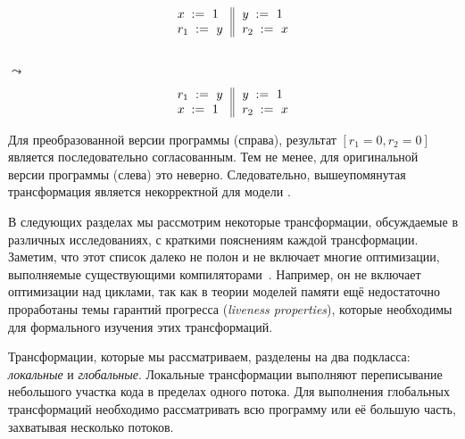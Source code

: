 \begin{minipage}{0.45\linewidth}
\begin{equation*}
\inarrII{
   \writeInst{}{x}{1}   \\
   \readInst{}{r_1}{y}  \\
}{
  \writeInst{}{y}{1}   \\
  \readInst{}{r_2}{x}  \\
}
\end{equation*}
\end{minipage}\hfill%
\begin{minipage}{0.05\linewidth}
\Large~\\ $\leadsto$
\end{minipage}\hfill%
\begin{minipage}{0.45\linewidth}
\begin{equation*}
\inarrII{
   \readInst{}{r_1}{y}  \\
   \writeInst{}{x}{1}   \\
}{
  \writeInst{}{y}{1}   \\
  \readInst{}{r_2}{x}  \\
}
\end{equation*}
\end{minipage}

Для преобразованной версии программы (справа),
результат $[r_1=0, r_2=0]$ является последовательно согласованным. 
Тем не менее, для оригинальной версии программы (слева) это неверно. 
Следовательно, вышеупомянутая трансформация 
является некорректной для модели \SC. 

В следующих разделах мы рассмотрим  некоторые  трансформации,
обсуждаемые в различных исследованиях, 
с краткими пояснениям каждой трансформации. 
Заметим, что этот список далеко не полон 
и не включает многие оптимизации, 
выполняемые существующими компиляторами~\cite{Muchnick:ACDI97}.
Например, он не включает оптимизации над циклами,
так как в теории моделей памяти ещё недостаточно 
проработаны темы гарантий прогресса 
(\emph{liveness properties}), 
которые необходимы для формального 
изучения этих трансформаций. 

Трансформации, которые мы рассматриваем,  
разделены на два подкласса: \emph{локальные} и \emph{глобальные}.
Локальные трансформации выполняют переписывание 
небольшого участка кода в пределах одного потока. 
Для выполнения глобальных трансформаций 
необходимо рассматривать всю программу 
или её большую часть, 
захватывая несколько потоков.      
 
